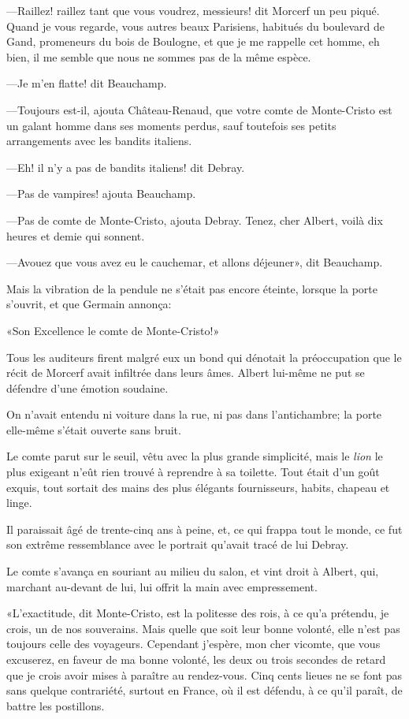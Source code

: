 —Raillez! raillez tant que vous voudrez, messieurs! dit Morcerf un peu piqué. Quand je vous regarde, vous autres beaux Parisiens, habitués du boulevard de Gand, promeneurs du bois de Boulogne, et que je me rappelle cet homme, eh bien, il me semble que nous ne sommes pas de la même espèce. 

—Je m'en flatte! dit Beauchamp. 

—Toujours est-il, ajouta Château-Renaud, que votre comte de Monte-Cristo est un galant homme dans ses moments perdus, sauf toutefois ses petits arrangements avec les bandits italiens. 

—Eh! il n'y a pas de bandits italiens! dit Debray. 

—Pas de vampires! ajouta Beauchamp. 

—Pas de comte de Monte-Cristo, ajouta Debray. Tenez, cher Albert, voilà dix heures et demie qui sonnent.  

—Avouez que vous avez eu le cauchemar, et allons déjeuner», dit Beauchamp. 

Mais la vibration de la pendule ne s'était pas encore éteinte, lorsque la porte s'ouvrit, et que Germain annonça: 

«Son Excellence le comte de Monte-Cristo!» 

Tous les auditeurs firent malgré eux un bond qui dénotait la préoccupation que le récit de Morcerf avait infiltrée dans leurs âmes. Albert lui-même ne put se défendre d'une émotion soudaine. 

On n'avait entendu ni voiture dans la rue, ni pas dans l'antichambre; la porte elle-même s'était ouverte sans bruit.  

Le comte parut sur le seuil, vêtu avec la plus grande simplicité, mais le \textit{lion} le plus exigeant n'eût rien trouvé à reprendre à sa toilette. Tout était d'un goût exquis, tout sortait des mains des plus élégants fournisseurs, habits, chapeau et linge. 

Il paraissait âgé de trente-cinq ans à peine, et, ce qui frappa tout le monde, ce fut son extrême ressemblance avec le portrait qu'avait tracé de lui Debray. 

Le comte s'avança en souriant au milieu du salon, et vint droit à Albert, qui, marchant au-devant de lui, lui offrit la main avec empressement. 

«L'exactitude, dit Monte-Cristo, est la politesse des rois, à ce qu'a prétendu, je crois, un de nos souverains. Mais quelle que soit leur bonne volonté, elle n'est pas toujours celle des voyageurs. Cependant j'espère, mon cher vicomte, que vous excuserez, en faveur de ma bonne volonté, les deux ou trois secondes de retard que je crois avoir mises à paraître au rendez-vous. Cinq cents lieues ne se font pas sans quelque contrariété, surtout en France, où il est défendu, à ce qu'il paraît, de battre les postillons. 

